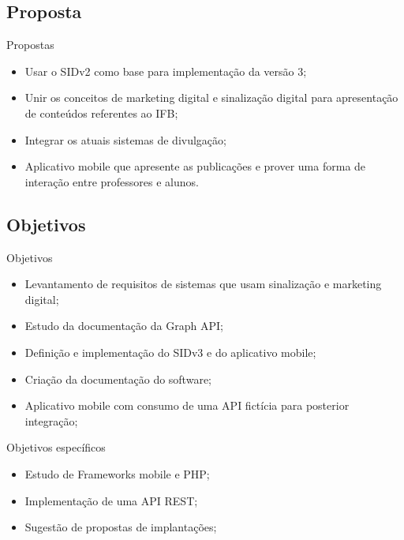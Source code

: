 \documentclass{aula-ifb}
\begin{document}
\subsection{Proposta}
\begin{frame}{Propostas}
	\begin{itemize}
		\item Usar o SIDv2 como base para implementação da versão 3;
		\vspace{10px}
		\item Unir os conceitos de marketing digital e sinalização digital para apresentação de conteúdos referentes ao IFB;
		\vspace{10px}
		\item Integrar os atuais sistemas de divulgação;
		\vspace{10px}
		\item Aplicativo mobile que apresente as publicações e prover uma forma de interação entre professores e alunos.
	\end{itemize}
\end{frame}

\subsection{Objetivos}
\begin{frame}{Objetivos}
	\begin{itemize}
   		\item Levantamento de requisitos de sistemas que usam sinalização e marketing digital;
   		\vspace{10px}
   		\item Estudo da documentação da Graph API;
   		\vspace{10px}
   		\item Definição e implementação do SIDv3 e do aplicativo mobile;
   		\vspace{10px}
   		\item Criação da documentação do software;
   		\vspace{10px}
   		\item Aplicativo mobile com consumo de uma API fictícia para posterior integração;
	\end{itemize}
\end{frame}

\begin{frame}{Objetivos específicos}
	\begin{itemize}
   		\item Estudo de Frameworks mobile e PHP;
   		\vspace{10px}
   		\item Implementação de uma API REST;
   		\vspace{10px}
   		\item Sugestão de propostas de implantações;
	\end{itemize}
\end{frame}
\end{document}
